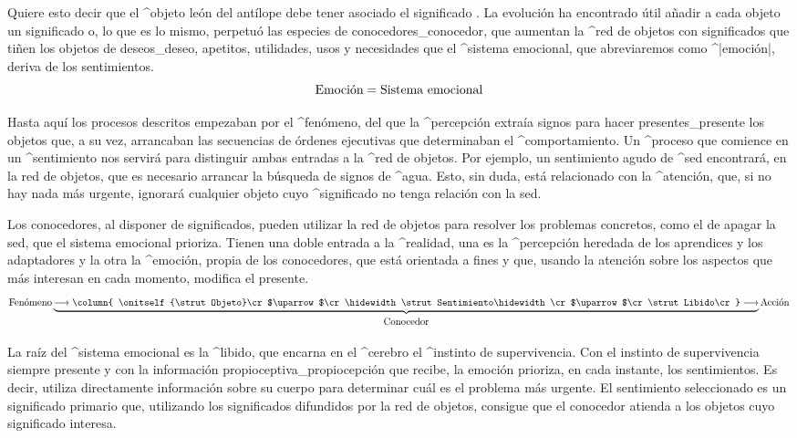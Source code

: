 Quiere esto decir que el ^{objeto} león del antílope debe tener asociado
el significado . La evolución ha encontrado útil
añadir a cada objeto un significado o, lo que es lo mismo, perpetuó las
especies de conocedores_{conocedor}, que aumentan la ^{red de objetos}
con significados que tiñen los objetos de deseos_{deseo}, apetitos,
utilidades, usos y necesidades que el ^{sistema emocional}, que
abreviaremos como ^|emoción|, deriva de los sentimientos.
$$\hbox{Emoción} = \hbox{Sistema emocional}$$

Hasta aquí los procesos descritos empezaban por el ^{fenómeno}, del que
la ^{percepción} extraía signos para hacer presentes_{presente} los
objetos que, a su vez, arrancaban las secuencias de órdenes ejecutivas
que determinaban el ^{comportamiento}. Un ^{proceso} que comience en un
^{sentimiento} nos servirá para distinguir ambas entradas a la ^{red de
objetos}. Por ejemplo, un sentimiento agudo de ^{sed} encontrará, en la
red de objetos, que es necesario arrancar la búsqueda de signos de
^{agua}. Esto, sin duda, está relacionado con la ^{atención}, que, si no
hay nada más urgente, ignorará cualquier objeto cuyo ^{significado} no
tenga relación con la sed.

Los conocedores, al disponer de significados, pueden utilizar la red de
objetos para resolver los problemas concretos, como el de apagar la sed,
que el sistema emocional prioriza. Tienen una doble entrada a la
^{realidad}, una es la ^{percepción} heredada de los aprendices y los
adaptadores y la otra la ^{emoción}, propia de los conocedores, que está
orientada a fines y que, usando la atención sobre los aspectos que más
interesan en cada momento, modifica el presente.
$$\hbox{Fenómeno}
   \underbrace{
    \longrightarrow
    \column{
     \onitself{\strut Objeto}\cr
     $\uparrow$\cr
     \hidewidth\strut Sentimiento\hidewidth\cr
     $\uparrow$\cr
     \strut Libido\cr}
    \longrightarrow}_{\strut\hbox{Conocedor}}
  \hbox{Acción}
$$

\kern-12pt

La raíz del ^{sistema emocional} es la ^{libido}, que encarna en el
^{cerebro} el ^{instinto de supervivencia}. Con el instinto de
supervivencia siempre presente y con la información
propioceptiva_{propiocepción} que recibe, la emoción prioriza, en cada
instante, los sentimientos. Es decir, utiliza directamente información
sobre su cuerpo para determinar cuál es el problema más urgente. El
sentimiento seleccionado es un significado primario que, utilizando los
significados difundidos por la red de objetos, consigue que el conocedor
atienda a los objetos cuyo significado interesa.


